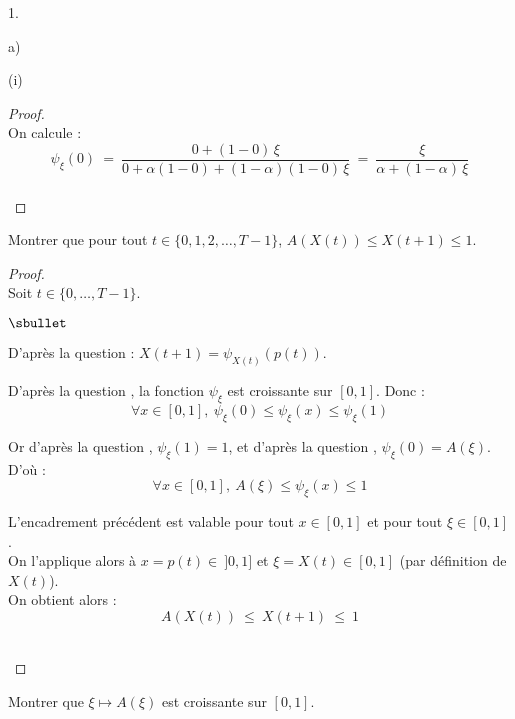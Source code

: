 \documentclass[11pt]{article}%
\begin{document}
\begin{noliste}{1.}
\begin{noliste}{a)}
\begin{nonoliste}{(i)}
      \begin{proof}~\\
        On calcule :
        \[
          \psi_\xi(0) \ = \ \dfrac{0 + (1-0) \, \xi}{0 + \alpha
          (1-0) + (1-\alpha)(1-0) \, \xi} \ = \ 
          \dfrac{\xi}{\alpha + (1-\alpha) \, \xi}
        \]
        ~\\[-1cm]
      \end{proof}
      
      

      
      \item Montrer que pour tout $t\in \{0,1,2, \ldots, T-1\}$, 
      $A(X(t)) \leq X(t+1) \leq 1$.
      
      \begin{proof}~\\
      Soit $t \in \{0, \ldots, T-1\}$.
        \begin{noliste}{$\sbullet$}
	  \item D'après la question  : $X(t+1) = 
	  \psi_{X(t)}(p(t))$.
	  
	  \item D'après la question , la fonction 
	  $\psi_\xi$ est croissante sur $[0,1]$. Donc :
	  \[
	    \forall x \in [0,1], \ \psi_\xi(0) \leq \psi_\xi(x) 
	    \leq \psi_\xi(1)
	  \]
	  
	  \item Or d'après la question , $\psi_\xi(1)=1$, et
	  d'après la question , $\psi_\xi(0)=A(\xi)$.
	  D'où :
	  \[
	    \forall x \in [0,1], \ A(\xi) \leq \psi_\xi(x) \leq 1
	  \]
	  
	  \item L'encadrement précédent est valable pour tout $x \in
	  [0,1]$ et pour tout $\xi \in [0,1]$.\\
	  On l'applique alors à $x=p(t) \in \ ]0,1]$ et $\xi = 
	  X(t) \in [0,1]$ (par définition de $X(t)$).\\
	  On obtient alors :
	  \[
	    A(X(t)) \ \leq \ X(t+1) \ \leq \ 1
	  \]
        \end{noliste}
        
        ~\\[-1.4cm]
      \end{proof}

      
      \item Montrer que $\xi \mapsto A(\xi)$ est croissante sur $[0,1]$.
      

\end{nonoliste}
\end{noliste}
\end{noliste}
\end{document}
